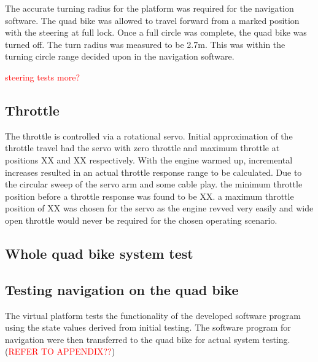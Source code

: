 \documentclass[main.tex]{subfiles}
\begin{document}
The accurate turning radius for the platform was required for the navigation software. The quad bike was allowed to travel forward from a marked position with the steering at full lock. Once a full circle was complete, the quad bike was turned off. The turn radius was measured to be 2.7m. This was within the turning circle range decided upon in the navigation software.

\textcolor{red}{steering tests more?}

\subsection{Throttle}
The throttle is controlled via a rotational servo. Initial approximation of the throttle travel had the servo with zero throttle and maximum throttle at positions XX and XX respectively. With the engine warmed up, incremental increases resulted in an actual throttle response range to be calculated. Due to the circular sweep of the servo arm and some cable play. the minimum throttle position before a throttle response was found to be XX. a maximum throttle position of XX was chosen for the servo as the engine revved very easily and wide open throttle would never be required for the chosen operating scenario.  

\subsection{Whole quad bike system test}


\subsection{Testing navigation on the quad bike}
The virtual platform tests the functionality of the developed software program using the state values derived from initial testing. The software program for navigation were then transferred to the quad bike for actual system testing. (\textcolor{red}{REFER TO APPENDIX??})
\end{document}
